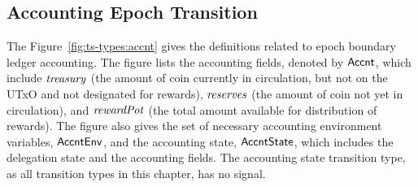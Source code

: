 \clearpage

\subsection{Accounting Epoch Transition}
\label{sec:acc-trans}

The Figure~\ref{fig:ts-types:accnt} gives the definitions related to epoch
boundary ledger accounting. The figure lists the accounting fields, denoted by
$\mathsf{Accnt}$, which include $\mathit{treasury}$ (the amount of coin currently in
circulation, but not on the UTxO and not designated for rewards),
$\mathit{reserves}$ (the amount of coin
not yet in circulation),
and $\mathit{rewardPot}$ (the total amount available for distribution of rewards).
The figure also gives the set of necessary accounting environment
variables, $\mathsf{AccntEnv}$, and the accounting state, $\mathsf{AccntState}$, which includes
the delegation state and the accounting fields. The accounting state transition
type, as all transition types in this chapter, has no signal.

